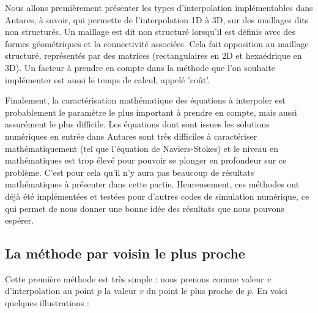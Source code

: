 \vspace{0,5cm}

Nous allons premièrement présenter les types d'interpolation implémentables dans Antares, à savoir, qui permette de l'interpolation \ac{1D} à 3D, sur des maillages dits non structurés.
Un maillage est dit non structuré lorsqu'il est définis avec des formes géométriques et la connectivité associées. Cela fait opposition au maillage structuré, représentés par des matrices (rectangulaires en 2D et hexaédrique en 3D).
Un facteur à prendre en compte dans la méthode que l'on souhaite implémenter est aussi le temps de calcul, appelé 'coût'.

Finalement, la caractérisation mathématique des équations à interpoler est probablement le paramètre le plus important à prendre en compte, mais aussi assurément le plus difficile. Les équations dont sont issues les solutions numériques en entrée dans Antares sont très difficiles à caractériser mathématiquement (tel que l'équation de Naviers-Stokes) et le niveau en mathématiques est trop élevé pour pouvoir se plonger en profondeur sur ce problème. C'est pour cela qu'il n'y aura pas beaucoup de résultats mathématiques à présenter dans cette partie.
Heureusement, ces méthodes ont déjà été implémentées et testées pour d'autres codes de simulation numérique, ce qui permet de nous donner une bonne idée des résultats que nous pouvons espérer.

\newpage

\subsection{La méthode par voisin le plus proche}
Cette première méthode est très simple : nous prenons comme valeur \( v \) d'interpolation au point \( p \) la valeur \( v \) du point le plus proche de \( p \).
En voici quelques illustrations :


